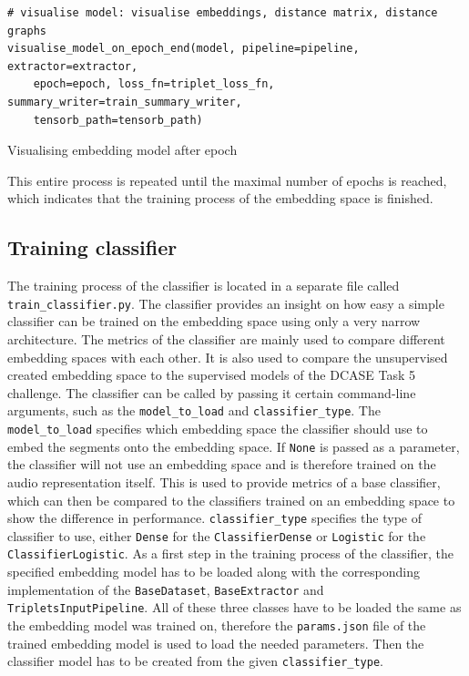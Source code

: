 \begin{code}[htbp]
\begin{verbatim}
# visualise model: visualise embeddings, distance matrix, distance graphs
visualise_model_on_epoch_end(model, pipeline=pipeline, extractor=extractor, 
    epoch=epoch, loss_fn=triplet_loss_fn, summary_writer=train_summary_writer, 
    tensorb_path=tensorb_path)
\end{verbatim}
\caption{Visualising embedding model after epoch}
\label{code:Visualising-Embedding-Model}
\end{code}
\noindent
This entire process is repeated until the maximal number of epochs is reached, which indicates that the training process of the embedding space is finished.

\subsection{Training classifier}
\label{sub:Training-Classifier}
The training process of the classifier is located in a separate file called \texttt{train\_classifier.py}. The classifier provides an insight on how easy a simple classifier can be trained on the embedding space using only a very narrow architecture. The metrics of the classifier are mainly used to compare different embedding spaces with each other. It is also used to compare the unsupervised created embedding space to the supervised models of the \gls{DCASE} Task 5 challenge.
\newline
\newline
The classifier can be called by passing it certain command-line arguments, such as the \texttt{model\_to\_load} and \texttt{classifier\_type}. The \texttt{model\_to\_load} specifies which embedding space the classifier should use to embed the segments onto the embedding space. If \texttt{None} is passed as a parameter, the classifier will not use an embedding space and is therefore trained on the audio representation itself. This is used to provide metrics of a base classifier, which can then be compared to the classifiers trained on an embedding space to show the difference in performance. \texttt{classifier\_type} specifies the type of classifier to use, either \texttt{Dense} for the \texttt{ClassifierDense} or \texttt{Logistic} for the \texttt{ClassifierLogistic}.
\newline
\newline
As a first step in the training process of the classifier, the specified embedding model has to be loaded along with the corresponding implementation of the \texttt{BaseDataset}, \texttt{BaseExtractor} and \texttt{TripletsInputPipeline}. All of these three classes have to be loaded the same as the embedding model was trained on, therefore the \texttt{params.json} file of the trained embedding model is used to load the needed parameters. Then the classifier model has to be created from the given \texttt{classifier\_type}.

